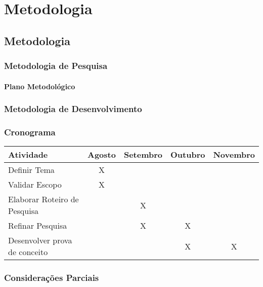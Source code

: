 \part{Metodologia}

\chapter{Metodologia}


\section{Metodologia de Pesquisa}


\subsection{Plano Metodológico}

\section{Metodologia de Desenvolvimento}
\section{Cronograma}

\begin{table}[h]
\begin{tabular}{|l|c|c|c|c|}
\hline
\textbf{Atividade}           & \multicolumn{1}{l|}{\textbf{Agosto}} & \multicolumn{1}{l|}{\textbf{Setembro}} & \multicolumn{1}{l|}{\textbf{Outubro}} & \multicolumn{1}{l|}{\textbf{Novembro}} \\ \hline
Definir Tema                 & X                                    &                                        &                                       &                                        \\ \hline
Validar Escopo               & X                                    &                                        &                                       &                                        \\ \hline
Elaborar Roteiro de Pesquisa &                                      & X                                      &                                       &                                        \\ \hline
Refinar Pesquisa             &                                      & X                                      & X                                     &                                        \\ \hline
Desenvolver prova de conceito   &                                      &                                        & X                                     & X                                      \\ \hline
\end{tabular}
\end{table}

\section{Considerações Parciais}